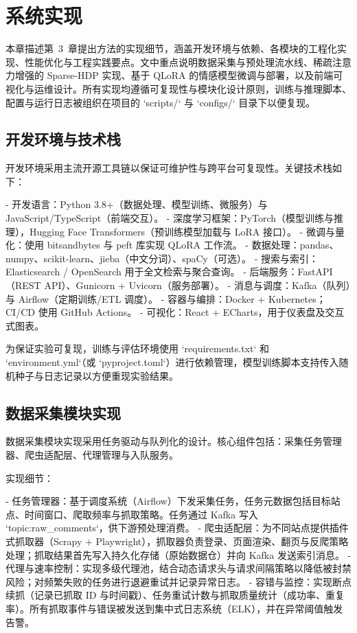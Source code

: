 \chapter{系统实现}
\label{ch:implementation}

本章描述第~3~章提出方法的实现细节，涵盖开发环境与依赖、各模块的工程化实现、性能优化与工程实践要点。文中重点说明数据采集与预处理流水线、稀疏注意力增强的 Sparse-HDP 实现、基于 QLoRA 的情感模型微调与部署，以及前端可视化与运维设计。所有实现均遵循可复现性与模块化设计原则，训练与推理脚本、配置与运行日志被组织在项目的 `scripts/` 与 `configs/` 目录下以便复现。

\section{开发环境与技术栈}
\label{sec:dev_env}

开发环境采用主流开源工具链以保证可维护性与跨平台可复现性。关键技术栈如下：

- 开发语言：Python 3.8+（数据处理、模型训练、微服务）与 JavaScript/TypeScript（前端交互）。
- 深度学习框架：PyTorch（模型训练与推理），Hugging Face Transformers（预训练模型加载与 LoRA 接口）。
- 微调与量化：使用 bitsandbytes 与 peft 库实现 QLoRA 工作流。 
- 数据处理：pandas、numpy、scikit-learn、jieba（中文分词）、spaCy（可选）。
- 搜索与索引：Elasticsearch / OpenSearch 用于全文检索与聚合查询。 
- 后端服务：FastAPI（REST API）、Gunicorn + Uvicorn（服务部署）。
- 消息与调度：Kafka（队列）与 Airflow（定期训练/ETL 调度）。
- 容器与编排：Docker + Kubernetes；CI/CD 使用 GitHub Actions。 
- 可视化：React + ECharts，用于仪表盘及交互式图表。

为保证实验可复现，训练与评估环境使用 `requirements.txt` 和 `environment.yml`（或 `pyproject.toml`）进行依赖管理，模型训练脚本支持传入随机种子与日志记录以方便重现实验结果。

\section{数据采集模块实现}
\label{sec:impl_data_collection}

数据采集模块实现采用任务驱动与队列化的设计。核心组件包括：采集任务管理器、爬虫适配层、代理管理与入队服务。

实现细节：

- 任务管理器：基于调度系统（Airflow）下发采集任务，任务元数据包括目标站点、时间窗口、爬取频率与抓取策略。任务通过 Kafka 写入 `topic:raw\_comments`，供下游预处理消费。 
- 爬虫适配层：为不同站点提供插件式抓取器（Scrapy + Playwright），抓取器负责登录、页面渲染、翻页与反爬策略处理；抓取结果首先写入持久化存储（原始数据仓）并向 Kafka 发送索引消息。
- 代理与速率控制：实现多级代理池，结合动态请求头与请求间隔策略以降低被封禁风险；对频繁失败的任务进行退避重试并记录异常日志。
- 容错与监控：实现断点续抓（记录已抓取 ID 与时间戳）、任务重试计数与抓取质量统计（成功率、重复率）。所有抓取事件与错误被发送到集中式日志系统（ELK），并在异常阈值触发告警。

